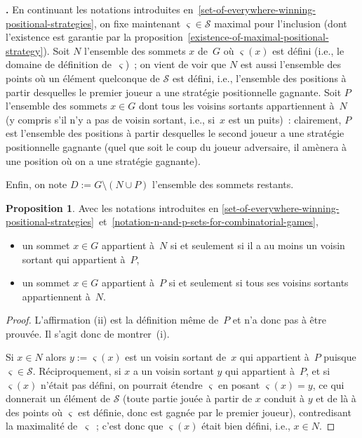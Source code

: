 \documentclass[12pt,a4paper]{article}
\theoremstyle{definition}
\newcommand\thingy{%
\refstepcounter{comcnt}\smallskip\noindent\textbf{\thecomcnt.} }
\newtheorem{prop}[comcnt]{Proposition}
\begin{document}
\thingy\label{notation-n-and-p-sets-for-combinatorial-games} En
continuant les notations introduites
en \ref{set-of-everywhere-winning-positional-strategies}, on fixe
maintenant $\varsigma \in \mathcal{S}$ maximal pour l'inclusion (dont
l'existence est garantie par la
proposition \ref{existence-of-maximal-positional-strategy}).  Soit $N$
l'ensemble des sommets $x$ de $G$ où $\varsigma(x)$ est défini (i.e.,
le domaine de définition de $\varsigma$) ; on vient de voir que $N$
est aussi l'ensemble des points où un élément quelconque de
$\mathcal{S}$ est défini, i.e., l'ensemble des positions à partir
desquelles le premier joueur a une stratégie positionnelle gagnante.
Soit $P$ l'ensemble des sommets $x\in G$ dont tous les voisins
sortants appartiennent à $N$ (y compris s'il n'y a pas de voisin
sortant, i.e., si $x$ est un puits) : clairement, $P$ est l'ensemble
des positions à partir desquelles le second joueur a une stratégie
positionnelle gagnante (quel que soit le coup du joueur adversaire, il
amènera à une position où on a une stratégie gagnante).

Enfin, on note $D := G\setminus(N\cup P)$ l'ensemble des sommets
restants.

\begin{prop}\label{positional-strategies-forall-exists-lemma}
Avec les notations introduites en
\ref{set-of-everywhere-winning-positional-strategies} et \ref{notation-n-and-p-sets-for-combinatorial-games},
\begin{itemize}
\item[(i)]un sommet $x\in G$ appartient à $N$ si et seulement si il a
  au moins un voisin sortant qui appartient à $P$,
\item[(ii)]un sommet $x\in G$ appartient à $P$ si et seulement si tous
  ses voisins sortants appartiennent à $N$.
\end{itemize}
\end{prop}
\begin{proof}
L'affirmation (ii) est la définition même de $P$ et n'a donc pas à
être prouvée.  Il s'agit donc de montrer (i).

Si $x\in N$ alors $y := \varsigma(x)$ est un voisin sortant de $x$ qui
appartient à $P$ puisque $\varsigma \in \mathcal{S}$.  Réciproquement,
si $x$ a un voisin sortant $y$ qui appartient à $P$, et si
$\varsigma(x)$ n'était pas défini, on pourrait étendre $\varsigma$ en
posant $\varsigma(x) = y$, ce qui donnerait un élément de
$\mathcal{S}$ (toute partie jouée à partir de $x$ conduit à $y$ et de
là à des points où $\varsigma$ est définie, donc est gagnée par le
premier joueur), contredisant la maximalité de $\varsigma$ ; c'est
donc que $\varsigma(x)$ était bien défini, i.e., $x\in N$.
\end{proof}
\end{document}

